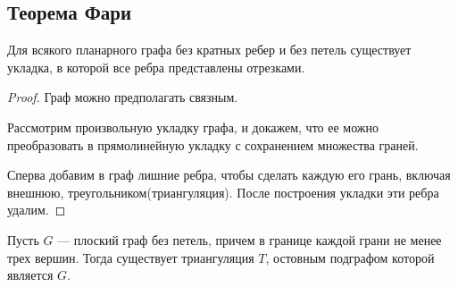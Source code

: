 \subsection{Теорема Фари}

\begin{theorem}[Фари, 1948]
    \label{thm:fari}
    Для всякого планарного графа без кратных ребер и без петель существует укладка, в которой все ребра представлены отрезками.
\end{theorem}

\begin{proof}

    Граф можно предполагать связным.
    
    Рассмотрим произвольную укладку графа, и докажем, что ее можно преобразовать в прямолинейную укладку с сохранением множества граней.
   
    Сперва добавим в граф лишние ребра, чтобы сделать каждую его грань, включая внешнюю, треугольником(триангуляция). После построения укладки эти ребра удалим.
\end{proof}

\begin{lemma}
    Пусть $G$ --- плоский граф без петель, причем в границе каждой грани не менее трех вершин. Тогда существует триангуляция $T$, остовным подграфом которой является $G$.
\end{lemma}

